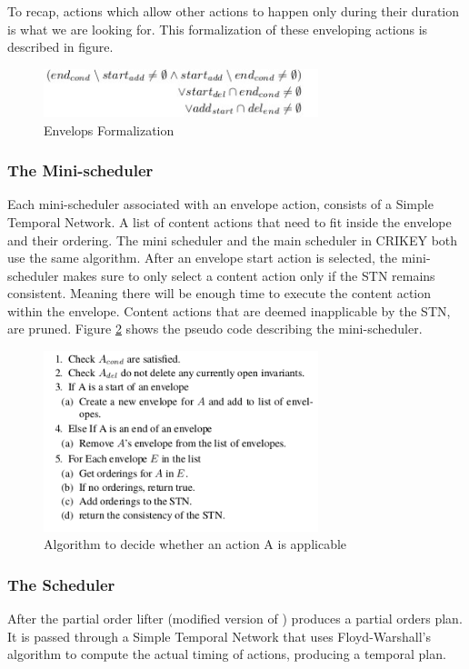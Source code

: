 \documentclass
[a4paper
,english
,parskip=half
,bibliography=totoc
]{scrreprt}
\begin{document}
          To recap, actions which allow other actions to happen only during their duration is what we are looking for. This formalization of these enveloping actions is described in figure.
          \begin{figure}[h]
            \centering    
            \includegraphics[width=8cm]{envelops.jpg}
            \caption{Envelops Formalization}
             \label{fig:envelops}
        \end{figure}


        \subsubsection{The Mini-scheduler}
        Each mini-scheduler associated with an envelope action, consists of a Simple Temporal Network. A list of content actions that need to fit inside the envelope and their ordering. The mini scheduler and the main scheduler in CRIKEY both use the same algorithm. After an envelope start action is selected, the mini-scheduler makes sure to only select a content action only if the STN remains consistent. Meaning there will be enough time to execute the content action within the envelope. Content actions that are deemed inapplicable by the STN, are pruned. Figure \ref{fig:algorithm} shows the pseudo code describing the mini-scheduler.
        \begin{figure}[h]
            \centering    
            \includegraphics[width=8cm]{sched_algorithm.png}
            \caption{Algorithm to decide whether an action A is applicable}
             \label{fig:algorithm}
        \end{figure}

        \subsubsection{The Scheduler}
        After the partial order lifter (modified version of \citep{rintegrating})  produces a partial orders plan. It is passed through a Simple Temporal Network that uses Floyd-Warshall's algorithm to compute the actual timing of actions, producing a temporal plan.
\end{document}
